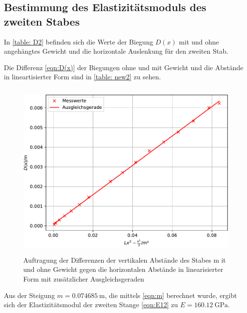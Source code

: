 \subsection{Bestimmung des Elastizitätsmoduls des zweiten Stabes}
In \ref{table: D2} befinden sich die Werte der Biegung $D(x)$
mit und ohne angehängtes Gewicht und die horizontale Auslenkung %
für den zweiten Stab.

Die Differenz \eqref{eqn:D(x)} der Biegungen ohne und mit Gewicht und die Abstände in
lineartisierter Form sind in \ref{table: new2} zu sehen.

\begin{figure}
  \centering
  \includegraphics[width=12cm, height=9cm]{./plots/Stange2.pdf}
  \caption{Auftragung der Differenzen der vertikalen Abstände des Stabes m      it und ohne Gewicht gegen die horizontalen Abstände in linearisierter Form       mit zusätzlicher Ausgleichsgeraden}
  \label{fig:plot2}
\end{figure}
Aus der Steigung $m = \SI{0.074685}{\meter}$, die mittels \eqref{eqn:m}
berechnet wurde, ergibt sich der Elastizitätsmodul der zweiten Stange \eqref{eqn:E12} zu
$E = \SI{160.12}{\giga\pascal}$.

